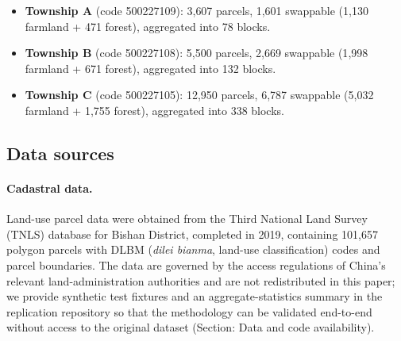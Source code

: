 \documentclass[preprint,12pt]{elsarticle}
\begin{document}
\begin{itemize}
\item \textbf{Township A} (code 500227109): 3{,}607 parcels, 1{,}601 swappable (1{,}130 farmland + 471 forest), aggregated into 78 blocks.
\item \textbf{Township B} (code 500227108): 5{,}500 parcels, 2{,}669 swappable (1{,}998 farmland + 671 forest), aggregated into 132 blocks.
\item \textbf{Township C} (code 500227105): 12{,}950 parcels, 6{,}787 swappable (5{,}032 farmland + 1{,}755 forest), aggregated into 338 blocks.
\end{itemize}

\begin{table}[htbp]
\centering
\caption{Characteristics of the three study townships and their block-level aggregation. ``Init.\ \textit{baimu}'' indicates the number of \textit{baimu fang} ($\geq$6.67\,ha contiguous farmland) present in the initial land-use configuration before any optimization.}
\label{tab:townships}
\end{table}

\subsection{Data sources}

\paragraph{Cadastral data.} Land-use parcel data were obtained from the Third National Land Survey (TNLS) database for Bishan District, completed in 2019, containing 101{,}657 polygon parcels with DLBM (\textit{dilei bianma}, land-use classification) codes and parcel boundaries. The data are governed by the access regulations of China's relevant land-administration authorities and are not redistributed in this paper; we provide synthetic test fixtures and an aggregate-statistics summary in the replication repository so that the methodology can be validated end-to-end without access to the original dataset (Section: Data and code availability).
\end{document}
